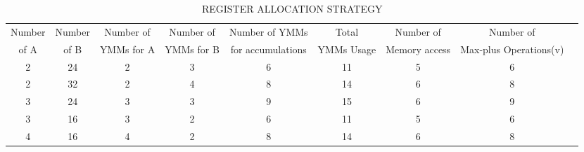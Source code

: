 \begin{table*}[htbp]
\caption{\uppercase{Register allocation Strategy}}
\label{tab:ymm_registers}
\begin{center}
\begin{tabular}{|c|c|c|c|c|c|c|c|c|}
\hline
Number & Number & Number of& Number of & Number of YMMs & Total &Number of & Number of   \\
of A & of B & YMMs for A & YMMs for  B&  for accumulations&YMMs Usage &Memory access&  Max-plus  Operations(v)\\
\hline
2 & 24 & 2 & 3 & 6 & 11  & 5 & 6 \\
\hline
2  & 32 & 2 & 4 & 8 & 14 & 6 & 8  \\
\hline
3 & 24 & 3 & 3 & 9 & 15  & 6 & 9 \\
\hline
3 & 16 & 3 & 2 & 6 & 11 & 5 & 6  \\
\hline
4 & 16 & 4 & 2 & 8 & 14  & 6 & 8  \\
\hline
\end{tabular}
\end{center}
\end{table*}





